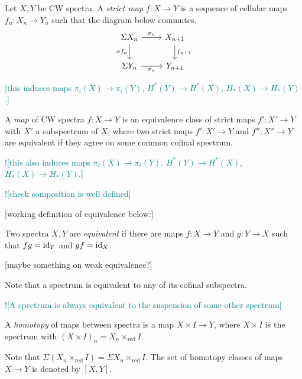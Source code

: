 \documentclass{MetricNotes2023}
\def\SIgma{\ensuremath\Sigma}
\def\id{\ensuremath\text{id}}
\def\textcolour{\textcolor}
\begin{document}
\begin{definition}
Let \(X, Y\) be CW spectra. A \textit{strict map} \(f : X \to Y\) is a sequence of cellular maps \(f_n : X_n \to Y_n\) such that the diagram below commutes.
\[\begin{tikzcd}
\Sigma X_n \arrow[r, "\sigma_n"] \arrow[d, swap, "\sigma f_n"]  & X_{n+1} \arrow[d, "f_{n+1}"]  \\
\SIgma Y_n \arrow[r, swap, "\sigma_n"]  & Y_{n+1}
\end{tikzcd}\]
\end{definition}

\textcolour{teal}{[this induces maps \(\pi_i(X)\to\pi_i(Y)\), \(H^*(Y)\to H^*(X)\), \(H_*(X)\to H_*(Y)\).]}

\begin{definition}
A \textit{map} of CW spectra \(f : X \to Y\) is an equivalence class of strict maps \(f' : X' \to Y\) with \(X'\) a subspectrum of \(X\), where two strict maps \(f' : X' \to Y\) and \(f'' : X'' \to Y\) are equivalent if they agree on some common cofinal spectrum. 
\end{definition}

\textcolour{teal}{![this also induces maps \(\pi_i(X)\to\pi_i(Y)\), \(H^*(Y)\to H^*(X)\), \(H_*(X)\to H_*(Y)\).]}

\textcolour{teal}{![check composition is well defined]}

[working definition of equivalence below:]

\begin{definition}
Two spectra \(X, Y\) are \textit{equivalent} if there are maps \(f : X \to Y\) and \(g : Y \to X\) such that \(fg=\id_{Y}\) and \(gf=\id_X\).
\end{definition}

[maybe something on weak equivalence?]

Note that a spectrum is equivalent to any of its cofinal subspectra.

\textcolour{teal}{![A spectrum is always equivalent to the suspension of some other spectrum]}

\begin{definition}
A \textit{homotopy} of maps between spectra is a map \(X\times I \to Y\), where \(X\times I\) is the spectrum with \((X\times I)_n=X_n\times_{\text{red}} I\).
\end{definition}

Note that \(\Sigma(X_n\times_{\text{red}}I)=\Sigma X_n\times_{\text{red}}I\). The set of homotopy classes of maps \(X\to Y\) is denoted by \([X,Y]\). 
\end{document}
